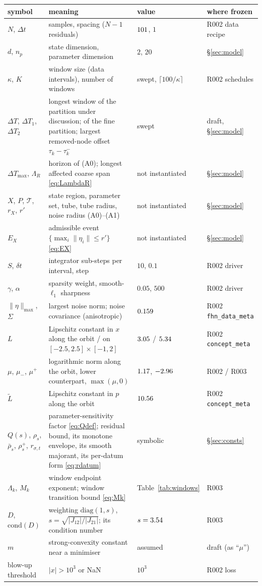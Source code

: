 \documentclass[11pt]{article}
\theoremstyle{remark}\newtheorem{remark}{Remark}
\newcommand{\norm}[1]{\lVert #1\rVert}
\begin{document}
\begin{center}\small
\begin{tabular}{p{}p{}p{}p{}}
\toprule
symbol & meaning & value & where frozen\\
\midrule
$N$, $\Delta t$ & samples, spacing ($N-1$ residuals) & $101$, $1$ & R002 data recipe\\
$d$, $n_p$ & state dimension, parameter dimension & $2$, $20$ & \S\ref{sec:model}\\
$\kappa$, $K$ & window size (data intervals), number of windows & swept, $\lceil100/\kappa\rceil$ & R002 schedules\\
$\Delta T$, $\Delta T_1$, $\Delta T_2$ & longest window of the partition under discussion; of the fine partition; largest removed-node offset $\tau_k-\tau_k^{-}$ & swept & draft, \S\ref{sec:model}\\
$\Delta T_{\max}$, $\Lambda_R$ & horizon of (A0); longest affected coarse span \eqref{eq:LambdaR} & not instantiated & \S\ref{sec:model}\\
$X$, $P$, $\mathcal T$, $r_X$, $r'$ & state region, parameter set, tube, tube radius, noise radius (A0)--(A1) & not instantiated & \S\ref{sec:model}\\
$E_X$ & admissible event $\{\max_i\norm{\eta_i}\le r'\}$ \eqref{eq:EX} & not instantiated & \S\ref{sec:model}\\
$S$, $\delta t$ & integrator sub-steps per interval, step & $10$, $0.1$ & R002 driver\\
$\gamma$, $\alpha$ & sparsity weight, smooth-$\ell_1$ sharpness & $0.05$, $500$ & R002 driver\\
$\norm{\eta}_{\max}$, $\Sigma$ & largest noise norm; noise covariance (anisotropic) & $0.159$ & R002 \texttt{fhn\_data\_meta}\\
$L$ & Lipschitz constant in $x$ along the orbit / on $[-2.5,2.5]\times[-1,2]$ & $3.05$ / $5.34$ & R002 \texttt{concept\_meta}\\
$\mu$, $\mu_-$, $\mu^{+}$ & logarithmic norm along the orbit, lower counterpart, $\max(\mu,0)$ & $1.17$, $-2.96$ & R002 / R003\\
$\tilde L$ & Lipschitz constant in $p$ along the orbit & $10.56$ & R002 \texttt{concept\_meta}\\
$Q(s)$, $\rho_s$, $\bar\rho_s$, $\rho^{+}_s$, $r_{\sigma,t}$ & parameter-sensitivity factor \eqref{eq:Qdef}; residual bound, its monotone envelope, its smooth majorant, its per-datum form \eqref{eq:rdatum} & symbolic & \S\ref{sec:consts}\\
$\Lambda_k$, $M_k$ & window endpoint exponent; window transition bound \eqref{eq:Mk} & Table~\ref{tab:windows} & R003\\
$D$, $\mathrm{cond}(D)$ & weighting $\mathrm{diag}(1,s)$, $s=\sqrt{|J_{12}|/|J_{21}|}$; its condition number & $s=3.54$ & R003\\
$m$ & strong-convexity constant near a minimiser & assumed & draft (as ``$\mu$'')\\
blow-up threshold & $|x|>10^3$ or NaN & $10^3$ & R002 loss\\
\bottomrule
\end{tabular}
\end{center}
\end{document}
